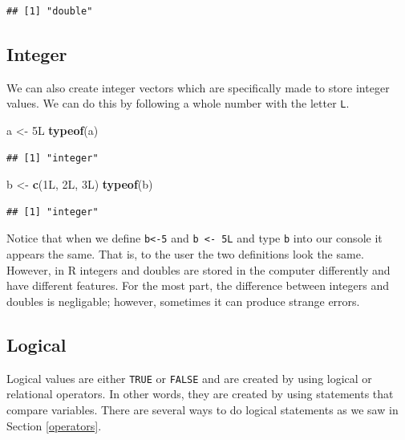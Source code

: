 \documentclass[
]{book}
\newenvironment{Shaded}{\begin{snugshade}}{\end{snugshade}}
\newcommand{\KeywordTok}[1]{\textcolor[rgb]{0.13,0.29,0.53}{\textbf{#1}}}
\newcommand{\NormalTok}[1]{#1}
\newcommand{\StringTok}[1]{\textcolor[rgb]{0.31,0.60,0.02}{#1}}
\begin{document}
\begin{verbatim}
## [1] "double"
\end{verbatim}

\hypertarget{integer}{%
\subsection*{Integer}\label{integer}}

We can also create integer vectors which are specifically made to store integer values. We can do this by following a whole number with the letter \texttt{L}.

\begin{Shaded}
\begin{Highlighting}[]
\NormalTok{a <-}\StringTok{ }\NormalTok{5L}
\KeywordTok{typeof}\NormalTok{(a)}
\end{Highlighting}
\end{Shaded}

\begin{verbatim}
## [1] "integer"
\end{verbatim}

\begin{Shaded}
\begin{Highlighting}[]
\NormalTok{b <-}\StringTok{ }\KeywordTok{c}\NormalTok{(1L, 2L, 3L)}
\KeywordTok{typeof}\NormalTok{(b)}
\end{Highlighting}
\end{Shaded}

\begin{verbatim}
## [1] "integer"
\end{verbatim}

Notice that when we define \texttt{b\textless{}-5} and \texttt{b\ \textless{}-\ 5L} and type \texttt{b} into our console it appears the same. That is, to the user the two definitions look the same. However, in R integers and doubles are stored in the computer differently and have different features. For the most part, the difference between integers and doubles is negligable; however, sometimes it can produce strange errors.

\hypertarget{logical}{%
\subsection*{Logical}\label{logical}}

Logical values are either \texttt{TRUE} or \texttt{FALSE} and are created by using logical or relational operators. In other words, they are created by using statements that compare variables. There are several ways to do logical statements as we saw in Section \ref{operators}.
\end{document}
